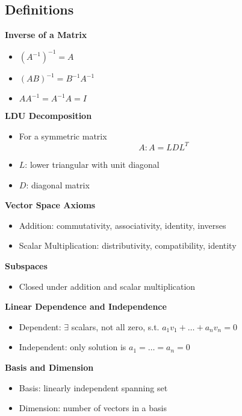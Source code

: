 \documentclass[8pt, a4paper, landscape]{extarticle}
\begin{document}
\begin{multicols*}{5}

  \section*{Definitions}

  \textbf{Inverse of a Matrix}
  \begin{itemize}
    \item $(A^{-1})^{-1} = A$
    \item $(AB)^{-1} = B^{-1}A^{-1}$
    \item $AA^{-1} = A^{-1}A = I$
  \end{itemize}

  \textbf{LDU Decomposition}
  \begin{itemize}
    \item For a symmetric matrix 
    \[
      A: A = LDL^T
    \]
    \item $L$: lower triangular with unit diagonal
    \item $D$: diagonal matrix
  \end{itemize}

  \textbf{Vector Space Axioms}
  \begin{itemize}
    \item Addition: commutativity, associativity, identity, inverses
    \item Scalar Multiplication: distributivity, compatibility, identity
  \end{itemize}

  \textbf{Subspaces}
  \begin{itemize}
    \item Closed under addition and scalar multiplication
  \end{itemize}

  \textbf{Linear Dependence and Independence}
  \begin{itemize}
    \item Dependent: $\exists$ scalars, not all zero, s.t. $a_1v_1 + \ldots + a_nv_n = 0$
    \item Independent: only solution is $a_1 = \ldots = a_n = 0$
  \end{itemize}

  \textbf{Basis and Dimension}
  \begin{itemize}
    \item Basis: linearly independent spanning set
    \item Dimension: number of vectors in a basis
  \end{itemize}


\end{multicols*}
\end{document}
